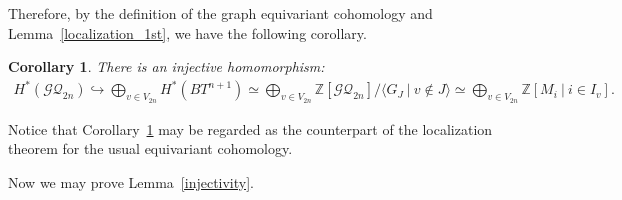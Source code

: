 \documentclass[12pt]{amsart}
\newtheorem{corollary}[theorem]{Corollary}
\theoremstyle{remark}
\numberwithin{equation}{section}
\begin{document}
Therefore, by the definition of the graph equivariant cohomology and Lemma~\ref{localization_1st},  we have the following corollary.
\begin{corollary}
\label{localization_theorem}
There is an injective homomorphism:
\begin{align*}
H^{*}(\mathcal{GQ}_{2n})\hookrightarrow \bigoplus_{v\in V_{2n}}H^{*}(BT^{n+1})\simeq \bigoplus_{v\in V_{2n}}\mathbb{Z}[\mathcal{GQ}_{2n}]/\langle G_{J}\ |\ v\not\in J \rangle\simeq \bigoplus_{v\in V_{2n}}\mathbb{Z}[M_{i}\ |\ i\in I_{v}].
\end{align*}
\end{corollary}

Notice that Corollary~\ref{localization_theorem} may be regarded as the counterpart of the localization theorem for the usual equivariant cohomology.


Now we may prove Lemma~\ref{injectivity}.
\end{document}
